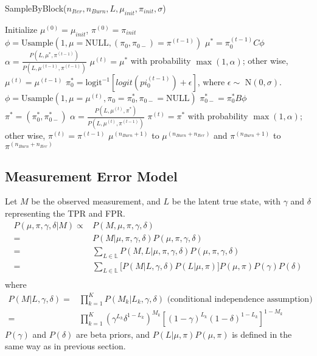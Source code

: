 \documentclass[11 pt, a4paper]{article}  %
\begin{document}
\begin{algorithm}[H]
\caption{SampleByBlock($n_{Iter}, n_{Burn}, L, \mu_{init}, \pi_{init}, \sigma$)}
\begin{algorithmic}[1]
\State Initialize $\mu^{(0)} = \mu_{init}$, $\pi^{(0)} = \pi_{init}$
\State $\phi = \text{Usample} (1, \mu=\text{NULL}, (\pi_0,\pi_{0-})=\pi^{(t-1)})$
\State $\mu^* = \pi_0^{(t-1)} C \phi $
\State $\alpha = \frac{P(L, \mu^*, \pi^{(t-1)} )}{P(L, \mu^{(t-1)}, \pi^{(t-1)} )}$
\State $\mu^{(t)} = \mu^*$ with probability $\max(1, \alpha)$; other wise, $\mu^{(t)} = \mu^{(t-1)}$
\State $\pi^*_{0} = \text{logit}^{-1}[logit(pi_{0}^{(t-1)}) + \epsilon]$, where $\epsilon \sim $ N$(0, \sigma)$.
\State $\phi = \text{Usample} (1, \mu=\mu^{(t)}, \pi_0=\pi^*_{0},\pi_{0-}=\text{NULL})$
\State $\pi^*_{0-} = \pi^*_{0} B \phi$
\State $\pi^* = (\pi^*_{0}, \pi^*_{0-})$
\State $\alpha = \frac{P(L, \mu^{(t)}, \pi^* )}{P(L, \mu^{(t)}, \pi^{(t-1)} )}$
\State $\pi^{(t)} = \pi^*$ with probability $\max(1, \alpha)$; other wise, $\pi^{(t)} = \pi^{(t-1)} $
\EndFor
{} $\mu^{(n_{Burn}+1)}$ to $\mu^{(n_{Burn} + n_{Iter})}$ and $\pi^{(n_{Burn}+1)}$ to $\pi^{(n_{Burn} + n_{Iter})}$
\end{algorithmic}
\end{algorithm}



\newpage
\subsection{Measurement Error Model}
Let $M$ be the observed measurement, and $L$ be the latent true state, with $\gamma$ and $\delta$ representing the TPR and FPR.
\begin{align*}
P(\mu, \pi , \gamma, \delta|M) \propto & P(M, \mu, \pi, \gamma, \delta) \\
= & P(M | \mu, \pi, \gamma, \delta) P(\mu, \pi, \gamma, \delta) \\
= & \sum_{L \in \mathbb{L}}  P(M, L | \mu, \pi, \gamma, \delta) P(\mu, \pi, \gamma, \delta) \\ 
= & \sum_{L \in \mathbb{L}} \big[ P(M | L, \gamma, \delta) P(L | \mu, \pi) \big ] P(\mu, \pi) P(\gamma) P(\delta) \\ 
\end{align*}
where 
\begin{align*}
 P(M | L, \gamma, \delta) = & \prod_{k=1}^K P(M_k | L_k, \gamma, \delta) \text{\ \ (conditional independence assumption)}\\
 = & \prod_{k=1}^K (\gamma^{L_k} \delta^{1-L_k})^{M_k} [(1-\gamma)^{L_k} (1-\delta)^{1-L_k}]^{1-M_k}
\end{align*}
$P(\gamma)$ and $ P(\delta)$ are beta priors, and $P(L | \mu, \pi)  P(\mu, \pi)$ is defined in the same way as in previous section.
\end{document}
